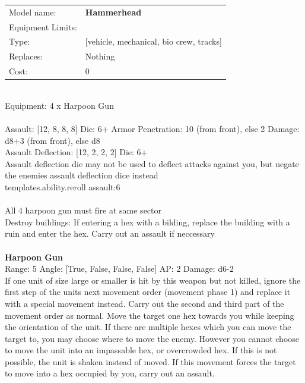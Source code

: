 \noindent
\begin{tabular}{ll}
Model name: &{\bf Hammerhead } \\
Equipment Limits: & \\
Type: &[vehicle, mechanical, bio crew, tracks] \\
Replaces: &Nothing \\
Cost: & 0\\
\end{tabular}
\ \\
Equipment: 4 x Harpoon Gun \\
\ \\
Assault: [12, 8, 8, 8] Die: 6+ Armor Penetration: 10 (from front), else 2 Damage: d8+3 (from front), else d8 \\
Assault Deflection: [12, 2, 2, 2] Die: 6+\\
\indent Assault deflection die may not be used to deflect attacks against you, but negate the enemies assault deflection dice instead\\ 
{templates.ability.reroll assault:6}\\ 
 
\ \\
All 4 harpoon gun must fire at same sector\\ 
Destroy buildings: If entering a hex with a bilding, replace the building with a ruin and enter the hex. Carry out an assault if neccessary\\ 

\ \\
{\bf Harpoon Gun } \\



Range: 5  Angle: [True, False, False, False] AP: 2 Damage: d6-2 \\
If one unit of size large or smaller is hit by this weapon but not killed, ignore the first step of the units next movement order (movement phase 1) and replace it with a special movement instead. Carry out the second and third part of the movement order as normal. Move the target one hex towards you while keeping the orientation of the unit. If there are multiple hexes which you can move the target to, you may choose where to move the enemy. However you cannot choose to move the unit into an impassable hex, or overcrowded hex. If this is not possible, the unit is shaken instead of moved. If this movement forces the target to move into a hex occupied by you, carry out an assault.\\ 





